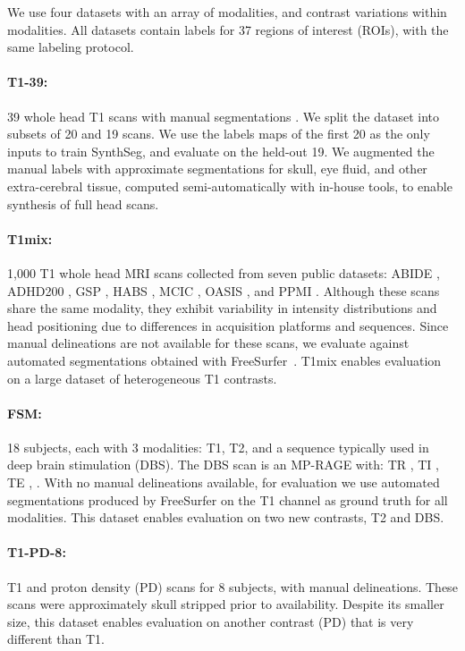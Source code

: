 \documentclass{midl}
\newcommand{\netname}{SynthSeg}
\begin{document}
We use four datasets with an array of modalities, and contrast variations within modalities. All datasets contain labels for 37 regions of interest (ROIs), with the same labeling protocol.

\paragraph{T1-39:} 39 whole head T1 scans with manual segmentations \cite{fischl_freesurfer_2012}. We split the dataset into subsets of 20 and 19 scans. We use the labels maps of the first 20 as the only inputs to train \netname{}, and evaluate on the held-out 19. We augmented the manual labels with approximate segmentations for skull, eye fluid, and other extra-cerebral tissue, computed semi-automatically with in-house tools, to enable synthesis of full head scans.

\paragraph{T1mix:}  1,000 T1 whole head MRI scans collected from seven public datasets: ABIDE \cite{di_martino_autism_2014}, ADHD200 \cite{the_adhd-200_consortium_adhd-200_2012}, GSP \cite{holmes_brain_2015}, HABS \cite{dagley_harvard_2017}, MCIC \cite{gollub_mcic_2013}, OASIS \cite{marcus_open_2007}, and PPMI \cite{marek_parkinson_2011}. Although these scans share the same modality, they exhibit variability in intensity distributions and head positioning due to differences in acquisition platforms and sequences. Since manual delineations are not available for these scans, we evaluate against automated segmentations obtained with FreeSurfer~\cite{fischl_freesurfer_2012,dalca_anatomical_2018}. T1mix enables evaluation on a large dataset of heterogeneous T1 contrasts.

\paragraph{FSM:} 18 subjects, each with 3 modalities: T1, T2, and a sequence typically used in deep brain stimulation (DBS). The DBS scan is an MP-RAGE with: TR , TI , TE , . With no manual delineations available, for evaluation we use automated segmentations produced by FreeSurfer on the T1 channel as ground truth for all modalities. This dataset enables evaluation on two new contrasts, T2 and DBS.

\paragraph{T1-PD-8:} T1 and proton density (PD) scans for 8 subjects, with manual delineations. These scans were approximately skull stripped prior to availability. Despite its smaller size, this dataset enables evaluation on another contrast (PD) that is very different than T1. \newline
\end{document}
